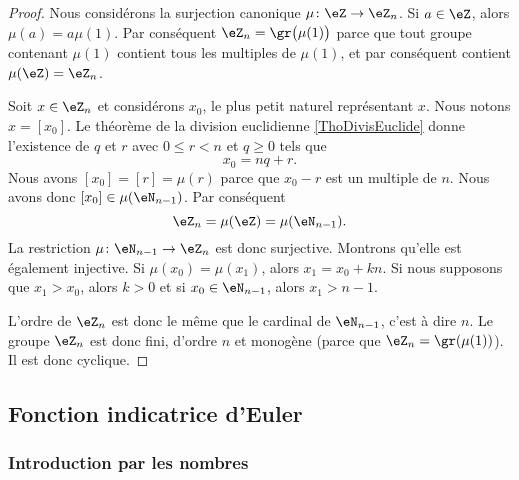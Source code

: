\begin{proof}
    Nous considérons la surjection canonique \( \mu\colon \eZ\to \eZ_n\). Si \( a\in\eZ\), alors \( \mu(a)=a\mu(1)\). Par conséquent \( \eZ_n=\gr\big( \mu(1) \big)\) parce que tout groupe contenant \( \mu(1)\) contient tous les multiples de \( \mu(1)\), et par conséquent contient \( \mu(\eZ)=\eZ_n\).

    Soit \( x\in\eZ_n\) et considérons \( x_0\), le plus petit naturel représentant \( x\). Nous notons \( x=[x_0]\). Le théorème de la division euclidienne \ref{ThoDivisEuclide} donne l'existence de \( q\) et \( r\) avec \( 0\leq r<n\) et \( q\geq 0\) tels que
    \begin{equation}
        x_0=nq+r.
    \end{equation}
    Nous avons \( [x_0]=[r]=\mu(r)\) parce que \( x_0-r\) est un multiple de \( n\). Nous avons donc \( [x_0]\in\mu(\eN_{n-1})\). Par conséquent
    \begin{equation}
        \eZ_n=\mu(\eZ)=\mu(\eN_{n-1}).
    \end{equation}
    La restriction \( \mu\colon \eN_{n-1}\to \eZ_n\) est donc surjective. Montrons qu'elle est également injective. Si \( \mu(x_0)=\mu(x_1)\), alors \( x_1=x_0+kn\). Si nous supposons que \( x_1>x_0\), alors \( k>0\) et si \( x_0\in\eN_{n-1}\), alors \( x_1>n-1\).

    L'ordre de \( \eZ_n\) est donc le même que le cardinal de \( \eN_{n-1}\), c'est à dire \( n\). Le groupe \( \eZ_n\) est donc fini, d'ordre \( n\) et monogène (parce que \( \eZ_n=\gr(\mu(1))\)). Il est donc cyclique.
\end{proof}
 
\subsection{Fonction indicatrice d'Euler}

\subsubsection{Introduction par les nombres}

